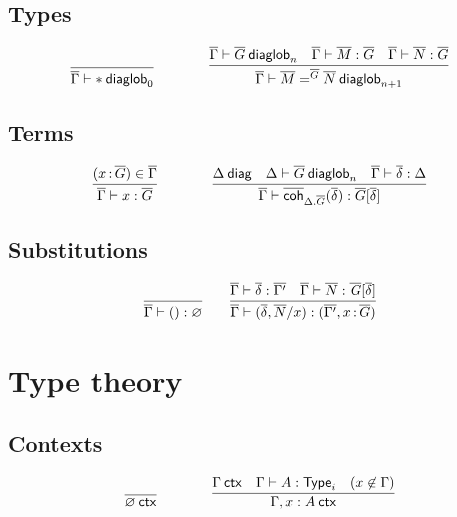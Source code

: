 \subsection{Types}

\begin{small}
  \[
  \infer{\wfdiaglob{\diag\Gamma}{\diagbase}0}{}
  \qquad\qquad
  \infer
    {\wfdiaglob{\diag\Gamma}{\homj{\diag G}{\diag M}{\diag N}}{n+1}}
    {\wfdiaglob{\diag\Gamma}{\diag G}n
    &\ofdiaglob{\diag\Gamma}{\diag M}{\diag G}
    &\ofdiaglob{\diag\Gamma}{\diag N}{\diag G}}
  \]
\end{small}

\subsection{Terms}

\begin{small}
  \[
  \infer{\ofdiaglob{\diag\Gamma}{x}{\diag G}}
  {(\tptm{x}{\diag G})\in\diag\Gamma}
  \qquad\qquad
  \infer{\ofdiaglob{\diag\Gamma}{\diagcoh{\Delta.\diag G}{\diag\delta}}
    {\diag G[\diag\delta]}}
  {\wfdiag{\Delta} 
    & \wfdiaglob{\Delta}{\diag G}n
    & \substdiaglob{\diag\Gamma}{\diag\delta}{\Delta}}
  \]
\end{small}

\subsection{Substitutions}

\begin{small}
  \[
  \infer{\substdiaglob{\diag\Gamma}{()}{\emptyctx}}
  {}
  \qquad
  \infer{\substdiaglob{\diag\Gamma}{(\diag \delta,\diag N/x)}
    {(\diag{\Gamma'},\tptm{x}{\diag G})}}
  {\substdiaglob{\diag\Gamma}{\diag \delta}{\diag{\Gamma'}}
    & \ofdiaglob{\diag\Gamma}{\diag N}{\tsubst{\diag G}{\diag \delta}}}
  \]
\end{small}

\section{Type theory}

\subsection{Contexts}

\begin{small}
  \[
  \infer{\wfctx{\varnothing}}{}
  \qquad\qquad
  \infer{\wfctx{\Gamma,x:A}}
  {\wfctx{\Gamma}
    & \wftype{\Gamma}{A}
    & (x\not\in\Gamma)}
  \]
\end{small}

